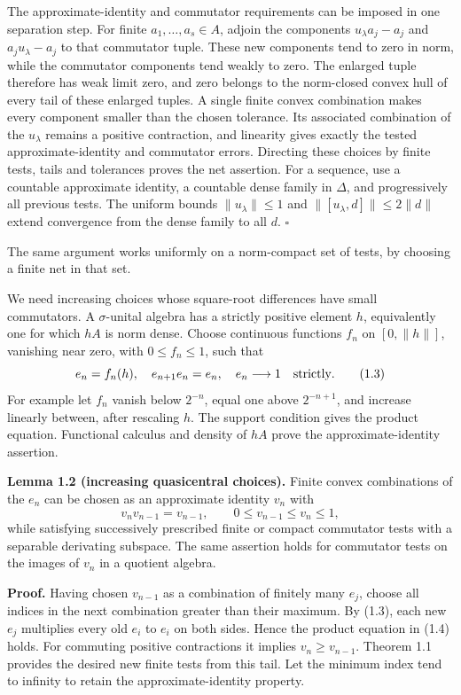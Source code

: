 \documentclass[
  11pt,
]{article}
\begin{document}
The approximate-identity and commutator requirements can be imposed in
one separation step. For finite \(a_1,\ldots,a_s\in A\), adjoin the
components \(u_\lambda a_j-a_j\) and \(a_j u_\lambda-a_j\) to that
commutator tuple. These new components tend to zero in norm, while the
commutator components tend weakly to zero. The enlarged tuple therefore
has weak limit zero, and zero belongs to the norm-closed convex hull of
every tail of these enlarged tuples. A single finite convex combination
makes every component smaller than the chosen tolerance. Its associated
combination of the \(u_\lambda\) remains a positive contraction, and
linearity gives exactly the tested approximate-identity and commutator
errors. Directing these choices by finite tests, tails and tolerances
proves the net assertion. For a sequence, use a countable approximate
identity, a countable dense family in \(\Delta\), and progressively all
previous tests. The uniform bounds \(\|u_\lambda\|\leq1\) and
\(\|[u_\lambda,d]\|\leq2\|d\|\) extend convergence from the dense family
to all \(d\). \(\square\)

The same argument works uniformly on a norm-compact set of tests, by
choosing a finite net in that set.

We need increasing choices whose square-root differences have small
commutators. A \(\sigma\)-unital algebra has a strictly positive element
\(h\), equivalently one for which \(hA\) is norm dense. Choose
continuous functions \(f_n\) on \([0,\|h\|]\), vanishing near zero, with
\(0\leq f_n\leq1\), such that \[
e_n=f_n(h),\quad e_{n+1}e_n=e_n,\quad e_n\longrightarrow1
\quad\hbox{strictly}.
\tag{1.3}
\] For example let \(f_n\) vanish below \(2^{-n}\), equal one above
\(2^{-n+1}\), and increase linearly between, after rescaling \(h\). The
support condition gives the product equation. Functional calculus and
density of \(hA\) prove the approximate-identity assertion.

\textbf{Lemma 1.2 (increasing quasicentral choices).} Finite convex
combinations of the \(e_n\) can be chosen as an approximate identity
\(v_n\) with \[
v_nv_{n-1}=v_{n-1},\qquad 0\leq v_{n-1}\leq v_n\leq1,
\tag{1.4}
\] while satisfying successively prescribed finite or compact commutator
tests with a separable derivating subspace. The same assertion holds for
commutator tests on the images of \(v_n\) in a quotient algebra.

\textbf{Proof.} Having chosen \(v_{n-1}\) as a combination of finitely
many \(e_j\), choose all indices in the next combination greater than
their maximum. By (1.3), each new \(e_j\) multiplies every old \(e_i\)
to \(e_i\) on both sides. Hence the product equation in (1.4) holds. For
commuting positive contractions it implies \(v_n\geq v_{n-1}\). Theorem
1.1 provides the desired new finite tests from this tail. Let the
minimum index tend to infinity to retain the approximate-identity
property.
\end{document}

